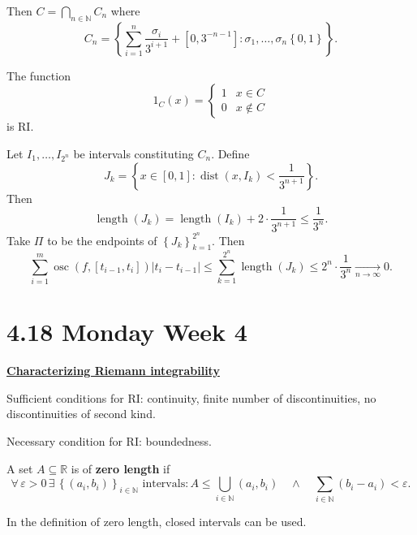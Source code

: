 \documentclass{notes}
\begin{document}
Then $C = \bigcap_{n \in \mathbb N} C_n$ where 
\[
  C_n = \left \{ \sum_{i = 1}^n \frac{\sigma_i}{3^{i + 1}} + [0, 3^{-n - 1}] : \sigma_1, \dots, \sigma_n \left \{ 0, 1 \right \} \right \}.
\]

\begin{lem}
  The function 
  \[
    1_C(x) = \begin{cases}
      1 & x \in C \\ 
      0 & x \not \in C
    \end{cases}
  \]
  is RI.
\end{lem}

\begin{prf}
  Let $I_1, \dots, I_{2^n}$ be intervals constituting $C_n$.
  Define 
  \[
    J_k = \left \{ x \in [0, 1] : \operatorname{dist}(x, I_k) < \frac{1}{3^{n + 1}} \right \}.
  \]
  Then 
  \[
    \operatorname{length}(J_k) = \operatorname{length}(I_k) + 2 \cdot \frac{1}{3^{n + 1}} \leq \frac{1}{3^n}.
  \] 
  Take $\Pi$ to be the endpoints of $\left \{ J_k \right \}_{k = 1}^{2^n}$.
  Then 
  \[
    \sum_{i = 1}^m \operatorname{osc}(f, [t_{i - 1}, t_i]) \left | t_i - t_{i - 1} \right | \leq \sum_{k = 1}^{2^n} \operatorname{length}(J_k) \leq 2^n \cdot \frac{1}{3^n} \underset{n \to \infty}{\longrightarrow} 0.
  \]
\end{prf}

\newpage

\section{4.18 Monday Week 4}

{\boldmath \bfseries \underline{Characterizing Riemann integrability}}

Sufficient conditions for RI: continuity, finite number of discontinuities, no discontinuities of second kind.

Necessary condition for RI: boundedness.

\begin{defn}
  A set $A \subseteq \mathbb R$ is of {\boldmath \bfseries zero length} if 
  \[
    \forall \, \varepsilon > 0 \, \exists \, \left \{ (a_i, b_i) \right \}_{i \in \mathbb N} \text{ intervals}: A \leq \bigcup_{i \in \mathbb N} (a_i, b_i) \quad \land \quad \sum_{i \in \mathbb N} (b_i - a_i) < \varepsilon.
  \]
\end{defn}

\begin{lem}
  In the definition of zero length, closed intervals can be used.
\end{lem}
\end{document}
